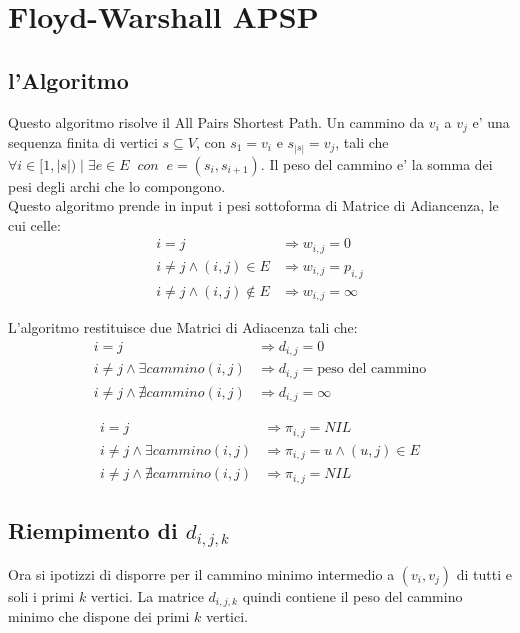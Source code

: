 \chapter{Floyd-Warshall APSP}

\section{l'Algoritmo}

Questo algoritmo risolve il All Pairs Shortest Path.
Un cammino da $v_{i}$ a $v_{j}$ e' una sequenza finita di vertici $s \subseteq V$, con $s_1 = v_{i}$ e $s_{|s|} = v_{j}$, tali che $\forall i \in [1, |s|) \mid \exists e \in E \;\; con \;\; e = (s_{i}, s_{i+1})$. Il peso del cammino e' la somma dei pesi degli archi che lo compongono. \\

Questo algoritmo prende in input i pesi sottoforma di Matrice di Adiancenza, le cui celle:
\begin{align*}
    i = j & \Rightarrow w_{i,j} = 0 \\
    i \ne j \land (i,j) \in E & \Rightarrow w_{i,j} = p_{i,j} \\
    i \ne j \land (i,j) \notin E & \Rightarrow w_{i,j} = \infty
\end{align*}

L'algoritmo restituisce due Matrici di Adiacenza tali che:
\begin{align*}
    i = j & \Rightarrow d_{i,j} = 0 \\
    i \ne j \land \exists cammino(i, j) & \Rightarrow d_{i,j} = \text{peso del cammino} \\
    i \ne j \land \nexists cammino(i, j) & \Rightarrow d_{i,j} = \infty
\end{align*}

\begin{align*}
    i = j & \Rightarrow \pi_{i,j} = NIL \\
    i \ne j \land \exists cammino(i, j) & \Rightarrow \pi_{i,j} = u \land (u,j) \in E \\
    i \ne j \land \nexists cammino(i, j) & \Rightarrow \pi_{i,j} = NIL
\end{align*}

\section{Riempimento di $d_{i,j,k}$}

Ora si ipotizzi di disporre per il cammino minimo intermedio a $(v_i,v_j)$ di tutti e soli i primi $k$ vertici.
La matrice $d_{i,j,k}$ quindi contiene il peso del cammino minimo che dispone dei primi $k$ vertici.

